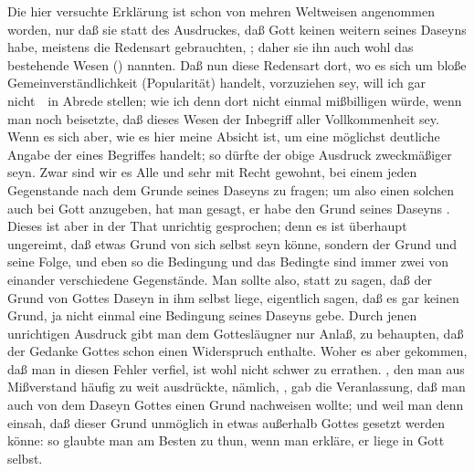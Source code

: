 \begin{aufza}
\begin{RWanm}
Die hier versuchte Erklärung ist schon von mehren Weltweisen angenommen worden, nur daß sie statt des Ausdruckes, daß Gott keinen weitern  seines Daseyns habe, meistens die Redensart gebrauchten, ; daher sie ihn auch wohl das  bestehende Wesen () nannten. Daß nun diese Redensart dort, wo es sich um bloße Gemeinverständlichkeit (Popularität) handelt, vorzuziehen sey, will ich gar nicht~\ in Abrede stellen; wie ich denn dort nicht einmal mißbilligen würde, wenn man noch beisetzte, daß dieses Wesen der Inbegriff aller Vollkommenheit sey. Wenn es sich aber, wie es hier meine Absicht ist, um eine möglichst deutliche Angabe der  eines Begriffes handelt; so dürfte der obige Ausdruck zweckmäßiger seyn. Zwar sind wir es Alle und sehr mit Recht gewohnt, bei einem jeden Gegenstande nach dem Grunde seines Daseyns zu fragen; um also einen solchen auch bei Gott anzugeben, hat man gesagt, er habe den Grund seines Daseyns . Dieses ist aber in der That unrichtig gesprochen; denn es ist überhaupt ungereimt, daß etwas Grund von sich selbst seyn könne, sondern der Grund und seine Folge, und eben so die Bedingung und das Bedingte sind immer zwei von einander verschiedene Gegenstände. Man sollte also, statt zu sagen, daß der Grund von Gottes Daseyn in ihm selbst liege, eigentlich sagen, daß es gar keinen Grund, ja nicht einmal eine Bedingung seines Daseyns gebe. Durch jenen unrichtigen Ausdruck gibt man dem Gottesläugner nur Anlaß, zu behaupten, daß der Gedanke Gottes schon  einen Widerspruch enthalte. Woher es aber gekommen, daß man in diesen Fehler verfiel, ist wohl nicht schwer zu errathen. , den man aus Mißverstand häufig zu weit ausdrückte, nämlich, , gab die Veranlassung, daß man auch von dem Daseyn Gottes einen Grund nachweisen wollte; und weil man denn einsah, daß dieser Grund unmöglich in etwas außerhalb Gottes gesetzt werden könne: so glaubte man am Besten zu thun, wenn man erkläre, er liege in Gott selbst.
\end{RWanm}
\end{aufza}

